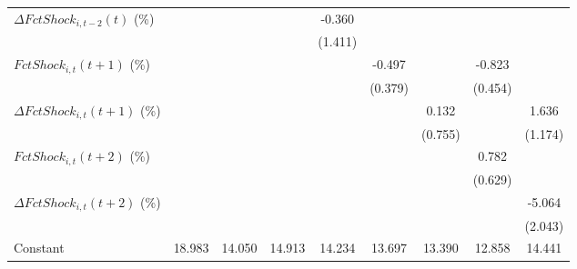{\begin{tabular}{l*{8}{c}}
\addlinespace
$ \Delta FctShock_{i,t-2}(t)$ (\%)&                     &                     &                     &      -0.360         &                     &                     &                     &                     \\
                    &                     &                     &                     &     (1.411)         &                     &                     &                     &                     \\
\addlinespace
$ FctShock_{i,t}(t+1)$ (\%)&                     &                     &                     &                     &      -0.497         &                     &      -0.823\sym{*}  &                     \\
                    &                     &                     &                     &                     &     (0.379)         &                     &     (0.454)         &                     \\
\addlinespace
$ \Delta FctShock_{i,t}(t+1)$ (\%)&                     &                     &                     &                     &                     &       0.132         &                     &       1.636         \\
                    &                     &                     &                     &                     &                     &     (0.755)         &                     &     (1.174)         \\
\addlinespace
$ FctShock_{i,t}(t+2)$ (\%)&                     &                     &                     &                     &                     &                     &       0.782         &                     \\
                    &                     &                     &                     &                     &                     &                     &     (0.629)         &                     \\
\addlinespace
$ \Delta FctShock_{i,t}(t+2)$ (\%)&                     &                     &                     &                     &                     &                     &                     &      -5.064\sym{**} \\
                    &                     &                     &                     &                     &                     &                     &                     &     (2.043)         \\
\addlinespace
Constant            &      18.983\sym{***}&      14.050\sym{***}&      14.913\sym{***}&      14.234\sym{***}&      13.697\sym{***}&      13.390\sym{***}&      12.858\sym{***}&      14.441\sym{***}\\

\end{tabular}}
